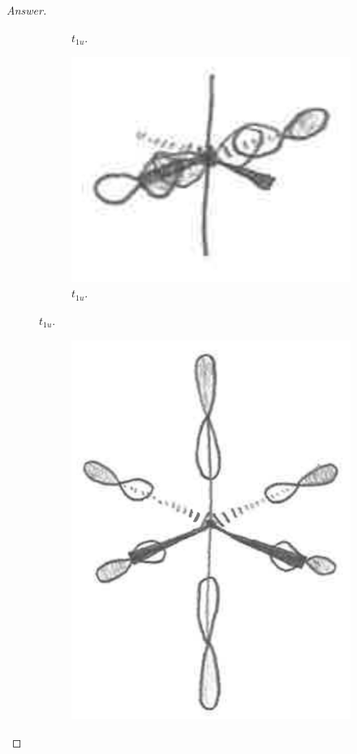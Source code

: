\documentclass[../psets.tex]{subfiles}
\begin{document}
\begin{enumerate}[label={\Roman*)}]
\begin{enumerate}[label={\alph*)}]
\begin{proof}[Answer]
\begin{figure}[H]
\begin{subfigure}[b]{0.24\linewidth}
                    \caption{$t_{1u}$.}
                    \label{fig:SALC-SF6c}
                \end{subfigure}
                \begin{subfigure}[b]{0.24\linewidth}
                    \centering
                    \includegraphics[width=0.8\linewidth]{../ExtFiles/SALC-SF6d.png}
                    \caption{$t_{1u}$.}
                    \label{fig:SALC-SF6d}
                \end{subfigure}
            \end{figure}
            \begin{figure}[H]\ContinuedFloat
                \centering
                \begin{subfigure}[b]{0.4\linewidth}
                    \centering
                    \includegraphics[width=0.7\linewidth]{../ExtFiles/SALC-SF6e.png}

\end{subfigure}
\end{figure}
\end{proof}
\end{enumerate}
\end{enumerate}
\end{document}
